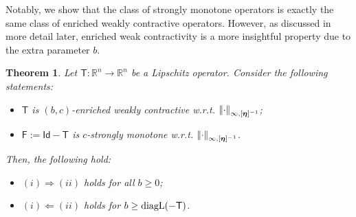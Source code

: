 \documentclass[journal,twoside,web]{ieeecolor}
\newcommand{\norm}[1]{{\left\vert\kern-0.25ex\left\vert #1\right\vert\kern-0.25ex\right\vert}}
\newcommand{\rea }{\mathbb{R}}
\newcommand{\etab}{\boldsymbol{\eta}}
\newcommand{\Fs}{\mathsf{F}}
\newcommand{\Ts}{\mathsf{T}}
\newcommand{\Is}{\mathsf{Id}}
\newtheorem{thm}{Theorem}
\begin{document}
Notably, we show that the class of strongly monotone operators is exactly the same class of enriched weakly contractive operators. However, as discussed in more detail later, enriched weak contractivity is a more insightful property due to the extra parameter $b$.
%
\begin{thm}\label{thm:mono-ene}
    Let $\Ts:\rea^n\rightarrow\rea^n$ be a Lipschitz operator. Consider the following statements:
    \begin{itemize}
        \item[(i)] $\Ts$ is $(b,c)$-enriched weakly contractive w.r.t. $\norm{\cdot}_{\infty,[\etab]^{-1}}$;
        \item[(ii)] $\Fs:=\Is-\Ts$ is $c$-strongly monotone w.r.t. $\norm{\cdot}_{\infty,[\etab]^{-1}}$.
    \end{itemize}
    Then, the following hold:
    \begin{itemize}
        \item[(a)] $(i) \Rightarrow (ii)$ holds for all $b\geq 0 $;
        \item[(b)] $(i) \Leftarrow  (ii)$ holds for $b\geq \textnormal{diagL}(-\Ts)$.
    \end{itemize}
\end{thm}
\end{document}
